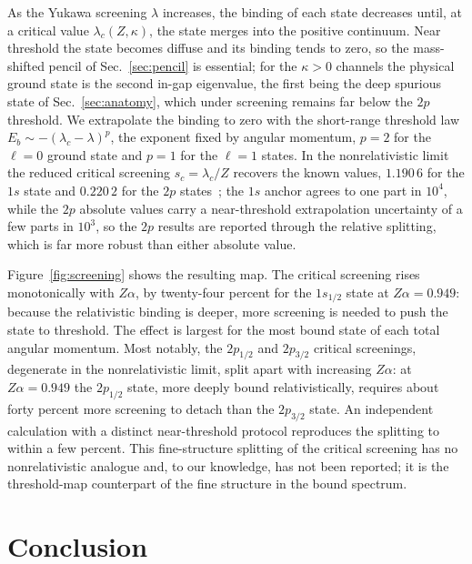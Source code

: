 \documentclass[aps,pra,twocolumn,superscriptaddress,showpacs,floatfix,longbibliography]{revtex4-2}
\newcommand{\Za}{\ensuremath{Z\alpha}}
\begin{document}
As the Yukawa screening $\lambda$ increases, the binding of each state
decreases until, at a critical value $\lambda_{c}(Z,\kappa)$, the state
merges into the positive continuum. Near threshold the state becomes
diffuse and its binding tends to zero, so the mass-shifted pencil of
Sec.~\ref{sec:pencil} is essential; for the $\kappa>0$ channels the
physical ground state is the second in-gap eigenvalue, the first being the
deep spurious state of Sec.~\ref{sec:anatomy}, which under screening
remains far below the $2p$ threshold. We extrapolate the binding to zero
with the short-range threshold law $E_{b}\sim-(\lambda_{c}-\lambda)^{p}$,
the exponent fixed by angular momentum, $p=2$ for the $\ell=0$ ground
state and $p=1$ for the $\ell=1$ states. In the nonrelativistic limit the
reduced critical screening $s_{c}=\lambda_{c}/Z$ recovers the known
values, $1.190\,6$ for the $1s$ state and $0.220\,2$ for the $2p$
states~\cite{RogersGraboskeHarwood1970,delValleNader2018}; the $1s$
anchor agrees to one part in $10^{4}$, while the $2p$ absolute values
carry a near-threshold extrapolation uncertainty of a few parts in
$10^{3}$, so the $2p$ results are reported through the relative splitting,
which is far more robust than either absolute value.

Figure~\ref{fig:screening} shows the resulting map. The critical screening
rises monotonically with $\Za$, by twenty-four percent for the $1s_{1/2}$
state at $\Za=0.949$: because the relativistic binding is deeper, more
screening is needed to push the state to threshold. The effect is largest
for the most bound state of each total angular momentum. Most notably, the
$2p_{1/2}$ and $2p_{3/2}$ critical screenings, degenerate in the
nonrelativistic limit, split apart with increasing $\Za$: at $\Za=0.949$
the $2p_{1/2}$ state, more deeply bound relativistically, requires about
forty percent more screening to detach than the $2p_{3/2}$ state. An
independent calculation with a distinct near-threshold protocol reproduces
the splitting to within a few percent. This fine-structure splitting of
the critical screening has no nonrelativistic analogue and, to our
knowledge, has not been reported; it is the threshold-map counterpart of
the fine structure in the bound spectrum.

\section{Conclusion}
\end{document}
